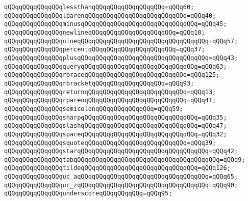 \verb|qQQqqQQqqQQqqQQqlessthanqQQqqQQqqQQqqQQqqQQq=qQQq60;|\newline
\verb|qQQqqQQqqQQqqQQqlparenqQQqqQQqqQQqqQQqqQQqqQQqqQQq=qQQq40;|\newline
\verb|qQQqqQQqqQQqqQQqminusqQQqqQQqqQQqqQQqqQQqqQQqqQQqqQQq=qQQq45;|\newline
\verb|qQQqqQQqqQQqqQQqnewlineqQQqqQQqqQQqqQQqqQQqqQQq=qQQq10;|\newline
\verb|qQQqqQQqqQQqqQQqnineqQQqqQQqqQQqqQQqqQQqqQQqqQQqqQQqqQQq=qQQq57;|\newline
\verb|qQQqqQQqqQQqqQQqpercentqQQqqQQqqQQqqQQqqQQqqQQq=qQQq37;|\newline
\verb|qQQqqQQqqQQqqQQqplusqQQqqQQqqQQqqQQqqQQqqQQqqQQqqQQqqQQq=qQQq43;|\newline
\verb|qQQqqQQqqQQqqQQqqueryqQQqqQQqqQQqqQQqqQQqqQQqqQQqqQQq=qQQq63;|\newline
\verb|qQQqqQQqqQQqqQQqrbraceqQQqqQQqqQQqqQQqqQQqqQQqqQQq=qQQq125;|\newline
\verb|qQQqqQQqqQQqqQQqrbracketqQQqqQQqqQQqqQQqqQQq=qQQq93;|\newline
\verb|qQQqqQQqqQQqqQQqreturnqQQqqQQqqQQqqQQqqQQqqQQqqQQq=qQQq13;|\newline
\verb|qQQqqQQqqQQqqQQqrparenqQQqqQQqqQQqqQQqqQQqqQQqqQQq=qQQq41;|\newline
\verb|qQQqqQQqqQQqqQQqsemicolonqQQqqQQqqQQqqQQq=qQQq59;|\newline
\verb|qQQqqQQqqQQqqQQqsharpqQQqqQQqqQQqqQQqqQQqqQQqqQQqqQQq=qQQq35;|\newline
\verb|qQQqqQQqqQQqqQQqslashqQQqqQQqqQQqqQQqqQQqqQQqqQQqqQQq=qQQq47;|\newline
\verb|qQQqqQQqqQQqqQQqspaceqQQqqQQqqQQqqQQqqQQqqQQqqQQqqQQq=qQQq32;|\newline
\verb|qQQqqQQqqQQqqQQqsquoteqQQqqQQqqQQqqQQqqQQqqQQqqQQq=qQQq39;|\newline
\verb|qQQqqQQqqQQqqQQqstarqQQqqQQqqQQqqQQqqQQqqQQqqQQqqQQqqQQq=qQQq42;|\newline
\verb|qQQqqQQqqQQqqQQqtabqQQqqQQqqQQqqQQqqQQqqQQqqQQqqQQqqQQqqQQq=qQQq9;|\newline
\verb|qQQqqQQqqQQqqQQqtildeqQQqqQQqqQQqqQQqqQQqqQQqqQQqqQQq=qQQq126;|\newline
\verb|qQQqqQQqqQQqqQQquc_aqQQqqQQqqQQqqQQqqQQqqQQqqQQqqQQqqQQq=qQQq65;|\newline
\verb|qQQqqQQqqQQqqQQquc_zqQQqqQQqqQQqqQQqqQQqqQQqqQQqqQQqqQQq=qQQq90;|\newline
\verb|qQQqqQQqqQQqqQQqunderscoreqQQqqQQqqQQq=qQQq95;|\newline
